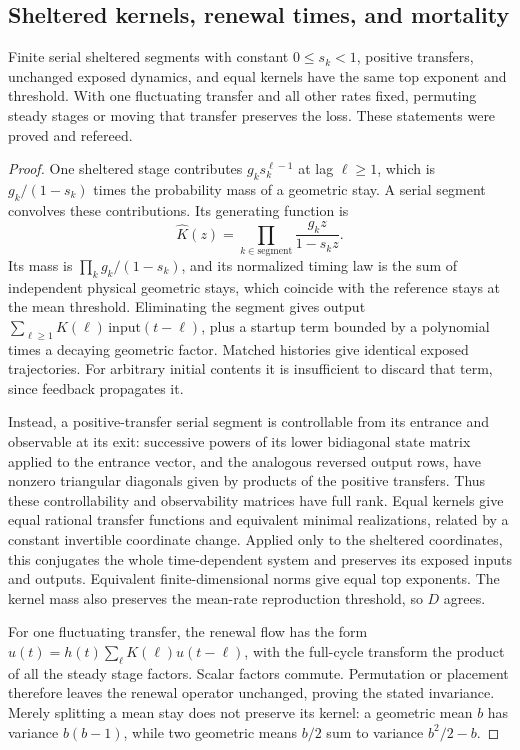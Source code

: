 \subsection{Sheltered kernels, renewal times, and mortality}\label{app:mech-renewal}
\begin{lemma}\label{lem:mech-kernel}
Finite serial sheltered segments with constant \(0\leq s_k<1\), positive transfers, unchanged exposed dynamics, and equal kernels have the same top exponent and threshold. With one fluctuating transfer and all other rates fixed, permuting steady stages or moving that transfer preserves the loss. These statements were proved and refereed.
\end{lemma}
\begin{proof}
One sheltered stage contributes \(g_ks_k^{\ell-1}\) at lag \(\ell\geq1\), which is \(g_k/(1-s_k)\) times the probability mass of a geometric stay. A serial segment convolves these contributions. Its generating function is
\[
 \widehat K(z)=\prod_{k\in\mathrm{segment}}\frac{g_kz}{1-s_kz}.
\]
Its mass is \(\prod_kg_k/(1-s_k)\), and its normalized timing law is the sum of independent physical geometric stays, which coincide with the reference stays at the mean threshold. Eliminating the segment gives output \(\sum_{\ell\geq1}K(\ell)\,\mathrm{input}(t-\ell)\), plus a startup term bounded by a polynomial times a decaying geometric factor. Matched histories give identical exposed trajectories. For arbitrary initial contents it is insufficient to discard that term, since feedback propagates it.

Instead, a positive-transfer serial segment is controllable from its entrance and observable at its exit: successive powers of its lower bidiagonal state matrix applied to the entrance vector, and the analogous reversed output rows, have nonzero triangular diagonals given by products of the positive transfers. Thus these controllability and observability matrices have full rank. Equal kernels give equal rational transfer functions and equivalent minimal realizations, related by a constant invertible coordinate change. Applied only to the sheltered coordinates, this conjugates the whole time-dependent system and preserves its exposed inputs and outputs. Equivalent finite-dimensional norms give equal top exponents. The kernel mass also preserves the mean-rate reproduction threshold, so \(D\) agrees.

For one fluctuating transfer, the renewal flow has the form \(u(t)=h(t)\sum_\ell K(\ell)u(t-\ell)\), with the full-cycle transform the product of all the steady stage factors. Scalar factors commute. Permutation or placement therefore leaves the renewal operator unchanged, proving the stated invariance. Merely splitting a mean stay does not preserve its kernel: a geometric mean \(b\) has variance \(b(b-1)\), while two geometric means \(b/2\) sum to variance \(b^2/2-b\).
\end{proof}

